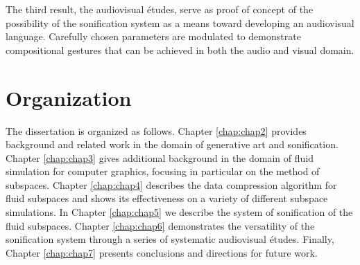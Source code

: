The third result, the audiovisual {\'e}tudes, serve as proof of concept of the possibility of the sonification system as a means toward developing an audiovisual language. Carefully chosen parameters are modulated to demonstrate compositional gestures that can be achieved in both the audio and visual domain. 

\section{Organization}
The dissertation is organized as follows. Chapter \ref{chap:chap2} provides background and related work in the domain of generative art and sonification. Chapter \ref{chap:chap3} gives additional background in the domain of fluid simulation for computer graphics, focusing in particular on the method of subspaces. Chapter \ref{chap:chap4} describes the data compression algorithm for fluid subspaces and shows its effectiveness on a variety of different subspace simulations. In Chapter \ref{chap:chap5} we describe the system of sonification of the fluid subspaces. Chapter \ref{chap:chap6} demonstrates the versatility of the sonification system through a series of systematic audiovisual {\'e}tudes. Finally, Chapter \ref{chap:chap7} presents conclusions and directions for future work.
